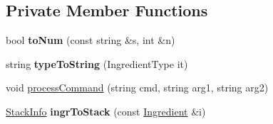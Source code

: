 \subsection*{Private Member Functions}
\begin{DoxyCompactItemize}
\item 
\hypertarget{classRecipe_a172cb7622220cfb41d6106aec1722493}{bool {\bfseries to\-Num} (const string \&s, int \&n)}\label{classRecipe_a172cb7622220cfb41d6106aec1722493}

\item 
\hypertarget{classRecipe_a611dc0aa9b91f6cd4a9d9a6dd5295bd8}{string {\bfseries type\-To\-String} (Ingredient\-Type it)}\label{classRecipe_a611dc0aa9b91f6cd4a9d9a6dd5295bd8}

\item 
void \hyperlink{classRecipe_a04717cbcd9526d308567e78caa13eac4}{process\-Command} (string cmd, string arg1, string arg2)
\item 
\hypertarget{classRecipe_a280aeb473fd69ef19df3654a54408d02}{\hyperlink{structStackInfo}{Stack\-Info} {\bfseries ingr\-To\-Stack} (const \hyperlink{classIngredient}{Ingredient} \&i)}\label{classRecipe_a280aeb473fd69ef19df3654a54408d02}


\end{DoxyCompactItemize}
